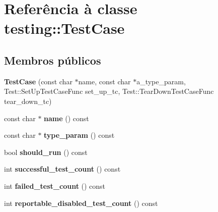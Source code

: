 \hypertarget{classtesting_1_1TestCase}{\section{Referência à classe testing\-:\-:Test\-Case}
\label{classtesting_1_1TestCase}
}
\subsection*{Membros públicos}
\begin{DoxyCompactItemize}
\item 
\hypertarget{classtesting_1_1TestCase_a8a43b04703bfc7d56597fcb9b76ffbf5}{{\bfseries Test\-Case} (const char $\ast$name, const char $\ast$a\-\_\-type\-\_\-param, Test\-::\-Set\-Up\-Test\-Case\-Func set\-\_\-up\-\_\-tc, Test\-::\-Tear\-Down\-Test\-Case\-Func tear\-\_\-down\-\_\-tc)}\label{classtesting_1_1TestCase_a8a43b04703bfc7d56597fcb9b76ffbf5}

\item 
\hypertarget{classtesting_1_1TestCase_af4dfd4ece8e66520a30e6a9fbd9d43aa}{const char $\ast$ {\bfseries name} () const }\label{classtesting_1_1TestCase_af4dfd4ece8e66520a30e6a9fbd9d43aa}

\item 
\hypertarget{classtesting_1_1TestCase_a2052c095bc6ac9c0ab1cae6f0e2d9fc9}{const char $\ast$ {\bfseries type\-\_\-param} () const }\label{classtesting_1_1TestCase_a2052c095bc6ac9c0ab1cae6f0e2d9fc9}

\item 
\hypertarget{classtesting_1_1TestCase_a0e49de754452943d88e3083e6cdded00}{bool {\bfseries should\-\_\-run} () const }\label{classtesting_1_1TestCase_a0e49de754452943d88e3083e6cdded00}

\item 
\hypertarget{classtesting_1_1TestCase_a8fb3974ccb5242ad9d1d633d53c0f730}{int {\bfseries successful\-\_\-test\-\_\-count} () const }\label{classtesting_1_1TestCase_a8fb3974ccb5242ad9d1d633d53c0f730}

\item 
\hypertarget{classtesting_1_1TestCase_ae74e7a2e75d07f9feca2c3384604cb01}{int {\bfseries failed\-\_\-test\-\_\-count} () const }\label{classtesting_1_1TestCase_ae74e7a2e75d07f9feca2c3384604cb01}

\item 
\hypertarget{classtesting_1_1TestCase_a4ec19c0058282562c0cc2c0e87d4b211}{int {\bfseries reportable\-\_\-disabled\-\_\-test\-\_\-count} () const }\label{classtesting_1_1TestCase_a4ec19c0058282562c0cc2c0e87d4b211}


\end{DoxyCompactItemize}

